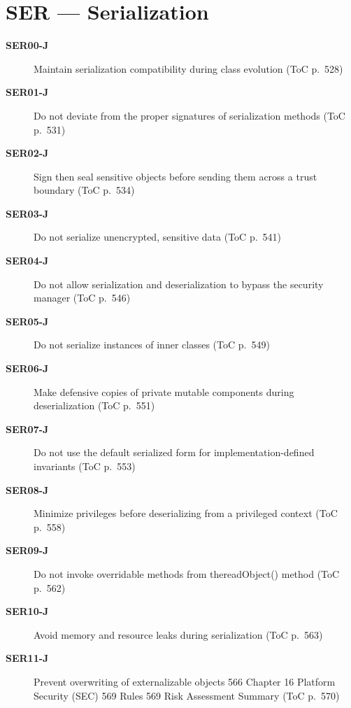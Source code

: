 \documentclass[11pt]{report}
\begin{document}
\chapter{SER — Serialization}
\begin{description}
\item[\textbf{SER00-J}] Maintain serialization compatibility during class evolution (ToC p.~528)
\item[\textbf{SER01-J}] Do not deviate from the proper signatures of serialization methods (ToC p.~531)
\item[\textbf{SER02-J}] Sign then seal sensitive objects before sending them across a trust boundary (ToC p.~534)
\item[\textbf{SER03-J}] Do not serialize unencrypted, sensitive data (ToC p.~541)
\item[\textbf{SER04-J}] Do not allow serialization and deserialization to bypass the security manager (ToC p.~546)
\item[\textbf{SER05-J}] Do not serialize instances of inner classes (ToC p.~549)
\item[\textbf{SER06-J}] Make defensive copies of private mutable components during deserialization (ToC p.~551)
\item[\textbf{SER07-J}] Do not use the default serialized form for implementation-defined invariants (ToC p.~553)
\item[\textbf{SER08-J}] Minimize privileges before deserializing from a privileged context (ToC p.~558)
\item[\textbf{SER09-J}] Do not invoke overridable methods from thereadObject() method (ToC p.~562)
\item[\textbf{SER10-J}] Avoid memory and resource leaks during serialization (ToC p.~563)
\item[\textbf{SER11-J}] Prevent overwriting of externalizable objects 566 Chapter 16 Platform Security (SEC) 569 Rules 569 Risk Assessment Summary (ToC p.~570)
\end{description}
\clearpage
\end{document}
